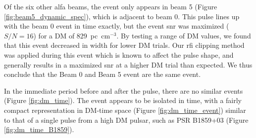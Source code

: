 \documentclass[a4paper,fleqn,usenatbib]{mnras}
\begin{document}
Of the six other \gls{alfa} beams, the event only appears in beam 5 (Figure
\ref{fig:beam5_dynamic_spec}), which is adjacent to beam 0.  This pulse lines up
with the beam 0 event in time exactly, but the event \gls{snr} was maximized
($S/N=16$) for a DM of 829~pc~cm$^{-3}$.  By testing a range of DM values, we
found that this event decreased in width for lower DM trials.  Our \gls{rfi}
clipping method was applied during this event which is known to affect the pulse
shape, and generally results in a maximized \gls{snr} at a higher DM trial than
expected.  We thus conclude that the Beam 0 and Beam 5 event are the same event.

In the immediate period before and after the pulse, there are no similar events
(Figure \ref{fig:dm_time}). The event appears to be isolated in time, with a
fairly compact representation in DM-time space (Figure \ref{fig:dm_time_event})
similar to that of a single pulse from a high DM pulsar, such as PSR B1859+03
(Figure \ref{fig:dm_time_B1859}).
\end{document}
